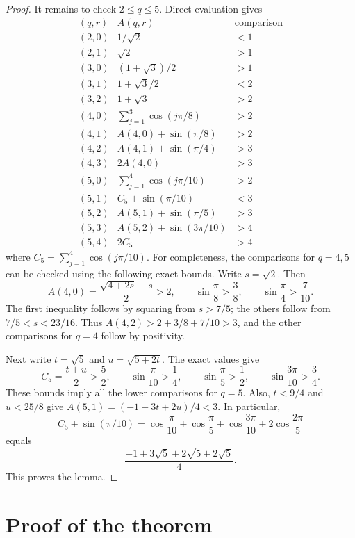\documentclass[11pt]{article}
\begin{document}
\begin{proof}
It remains to check \(2\le q\le5\). Direct evaluation gives
\[
\begin{array}{c|c|c}
(q,r) & A(q,r) & \text{comparison}\\
\hline
(2,0) & 1/\sqrt2 & <1\\
(2,1) & \sqrt2 & >1\\
(3,0) & (1+\sqrt3)/2 & >1\\
(3,1) & 1+\sqrt3/2 & <2\\
(3,2) & 1+\sqrt3 & >2\\
(4,0) & \sum_{j=1}^{3}\cos(j\pi/8) & >2\\
(4,1) & A(4,0)+\sin(\pi/8) & >2\\
(4,2) & A(4,1)+\sin(\pi/4) & >3\\
(4,3) & 2A(4,0) & >3\\
(5,0) & \sum_{j=1}^{4}\cos(j\pi/10) & >2\\
(5,1) & C_5+\sin(\pi/10) & <3\\
(5,2) & A(5,1)+\sin(\pi/5) & >3\\
(5,3) & A(5,2)+\sin(3\pi/10) & >4\\
(5,4) & 2C_5 & >4
\end{array}
\]
where \(C_5=\sum_{j=1}^{4}\cos(j\pi/10)\). For completeness, the
comparisons for \(q=4,5\) can be checked using the following exact
bounds. Write \(s=\sqrt2\). Then
\[
        A(4,0)=\frac{\sqrt{4+2s}+s}{2}>2,
        \qquad
        \sin\frac\pi8>\frac38,
        \qquad
        \sin\frac\pi4>\frac7{10}.
\]
The first inequality follows by squaring from \(s>7/5\); the others
follow from \(7/5<s<23/16\). Thus
\(A(4,2)>2+3/8+7/10>3\), and the other comparisons for \(q=4\)
follow by positivity.

Next write \(t=\sqrt5\) and \(u=\sqrt{5+2t}\). The exact values give
\[
        C_5=\frac{t+u}{2}>\frac52,\qquad
        \sin\frac\pi{10}>\frac14,\qquad
        \sin\frac\pi5>\frac12,\qquad
        \sin\frac{3\pi}{10}>\frac34.
\]
These bounds imply all the lower comparisons for \(q=5\). Also,
\(t<9/4\) and \(u<25/8\) give
\(A(5,1)=(-1+3t+2u)/4<3\). In particular,
\[
        C_5+\sin(\pi/10)
        =
        \cos\frac{\pi}{10}
        +\cos\frac{\pi}{5}
        +\cos\frac{3\pi}{10}
        +2\cos\frac{2\pi}{5}
\]
equals
\[
        \frac{-1+3\sqrt5+2\sqrt{5+2\sqrt5}}4.
\]
This proves the lemma.
\end{proof}

\section{Proof of the theorem}
\end{document}

